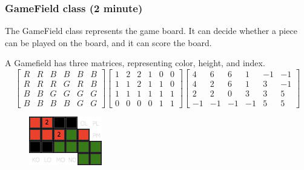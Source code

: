 \documentclass{beamer}
\begin{document}
\begin{frame}
\frametitle{GameField class (2 minute)}
The GameField class represents the game board. It can decide whether a piece can be played on the board, and it can score the board.

A Gamefield has three matrices, representing color, height, and index.
\tiny\[
  \begin{bmatrix}
    R & R & B & B & B & B \\ 
    R & R & R & G & R & B \\ 
    B & B & G & G & G & G \\ 
    B & B & B & B & G & G
  \end{bmatrix}
  \begin{bmatrix}
    1 & 2 & 2 & 1 & 0 & 0 \\ 
    1 & 1 & 2 & 1 & 1 & 0 \\ 
    1 & 1 & 1 & 1 & 1 & 1 \\ 
    0 & 0 & 0 & 0 & 1 & 1
  \end{bmatrix}
  \begin{bmatrix}
     4 &  6 &  6 &  1 & -1 & -1 \\ 
     4 &  2 &  6 &  1 &  3 & -1 \\ 
     2 &  2 &  0 &  3 &  3 &  5 \\ 
    -1 & -1 & -1 & -1 &  5 &  5
  \end{bmatrix}
\]
\begin{figure}
\includegraphics[width=0.4\linewidth]{6}
\end{figure}
\end{frame}
\end{document}
